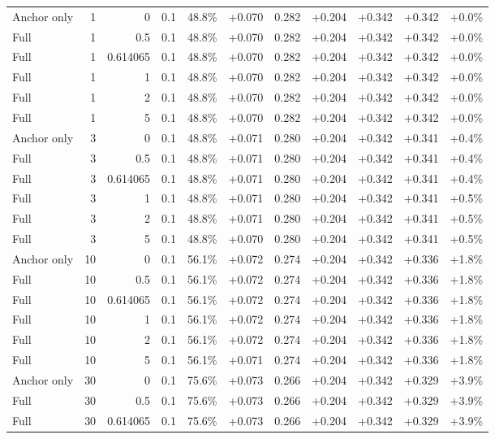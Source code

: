 \begin{table}[htbp]
\begin{tabular}{lrrrccccccc}
Anchor only & 1 & 0 & 0.1 & 48.8\% & +0.070 & 0.282 & +0.204 & +0.342 & +0.342 & +0.0\% \\
Full & 1 & 0.5 & 0.1 & 48.8\% & +0.070 & 0.282 & +0.204 & +0.342 & +0.342 & +0.0\% \\
Full & 1 & 0.614065 & 0.1 & 48.8\% & +0.070 & 0.282 & +0.204 & +0.342 & +0.342 & +0.0\% \\
Full & 1 & 1 & 0.1 & 48.8\% & +0.070 & 0.282 & +0.204 & +0.342 & +0.342 & +0.0\% \\
Full & 1 & 2 & 0.1 & 48.8\% & +0.070 & 0.282 & +0.204 & +0.342 & +0.342 & +0.0\% \\
Full & 1 & 5 & 0.1 & 48.8\% & +0.070 & 0.282 & +0.204 & +0.342 & +0.342 & +0.0\% \\
Anchor only & 3 & 0 & 0.1 & 48.8\% & +0.071 & 0.280 & +0.204 & +0.342 & +0.341 & +0.4\% \\
Full & 3 & 0.5 & 0.1 & 48.8\% & +0.071 & 0.280 & +0.204 & +0.342 & +0.341 & +0.4\% \\
Full & 3 & 0.614065 & 0.1 & 48.8\% & +0.071 & 0.280 & +0.204 & +0.342 & +0.341 & +0.4\% \\
Full & 3 & 1 & 0.1 & 48.8\% & +0.071 & 0.280 & +0.204 & +0.342 & +0.341 & +0.5\% \\
Full & 3 & 2 & 0.1 & 48.8\% & +0.071 & 0.280 & +0.204 & +0.342 & +0.341 & +0.5\% \\
Full & 3 & 5 & 0.1 & 48.8\% & +0.070 & 0.280 & +0.204 & +0.342 & +0.341 & +0.5\% \\
Anchor only & 10 & 0 & 0.1 & 56.1\% & +0.072 & 0.274 & +0.204 & +0.342 & +0.336 & +1.8\% \\
Full & 10 & 0.5 & 0.1 & 56.1\% & +0.072 & 0.274 & +0.204 & +0.342 & +0.336 & +1.8\% \\
Full & 10 & 0.614065 & 0.1 & 56.1\% & +0.072 & 0.274 & +0.204 & +0.342 & +0.336 & +1.8\% \\
Full & 10 & 1 & 0.1 & 56.1\% & +0.072 & 0.274 & +0.204 & +0.342 & +0.336 & +1.8\% \\
Full & 10 & 2 & 0.1 & 56.1\% & +0.072 & 0.274 & +0.204 & +0.342 & +0.336 & +1.8\% \\
Full & 10 & 5 & 0.1 & 56.1\% & +0.071 & 0.274 & +0.204 & +0.342 & +0.336 & +1.8\% \\
Anchor only & 30 & 0 & 0.1 & 75.6\% & +0.073 & 0.266 & +0.204 & +0.342 & +0.329 & +3.9\% \\
Full & 30 & 0.5 & 0.1 & 75.6\% & +0.073 & 0.266 & +0.204 & +0.342 & +0.329 & +3.9\% \\
Full & 30 & 0.614065 & 0.1 & 75.6\% & +0.073 & 0.266 & +0.204 & +0.342 & +0.329 & +3.9\% \\

\end{tabular}
\end{table}
